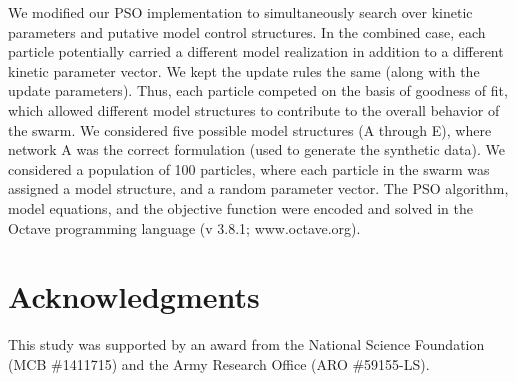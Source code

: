 \documentclass[processes,article,accept,moreauthors,pdftex,12pt,a4paper]{mdpi}
\begin{document}
We modified our PSO implementation to simultaneously search over kinetic parameters and putative model control structures.
In the combined case, each particle potentially carried a different model realization in addition to a different kinetic parameter vector. 
We kept the update rules the same (along with the update parameters). 
Thus, each particle competed on the basis of goodness of fit, which allowed different model structures to contribute to the overall behavior of the swarm. 
We considered five possible model structures (A through E), where network A was the correct formulation (used to generate the synthetic data). 
We considered a population of 100 particles, where each particle in the swarm was assigned a model structure, and a random parameter vector.
The PSO algorithm, model equations, and the objective function were encoded and solved in the Octave programming language (v 3.8.1; www.octave.org).

\section*{\noindent Acknowledgments}\vspace{12pt}

This study was supported by an award from the National Science Foundation (MCB \#1411715) 
and the Army Research Office (ARO \#59155-LS).

\clearpage
%
%





\renewcommand\thefigure{S\arabic{figure}}
\renewcommand\thetable{T\arabic{table}}
\renewcommand\thepage{S-\arabic{page}}
\renewcommand\theequation{S\arabic{equation}}

\setcounter{equation}{0}
\setcounter{table}{0}
\setcounter{figure}{0}
\setcounter{page}{1}
\end{document}

